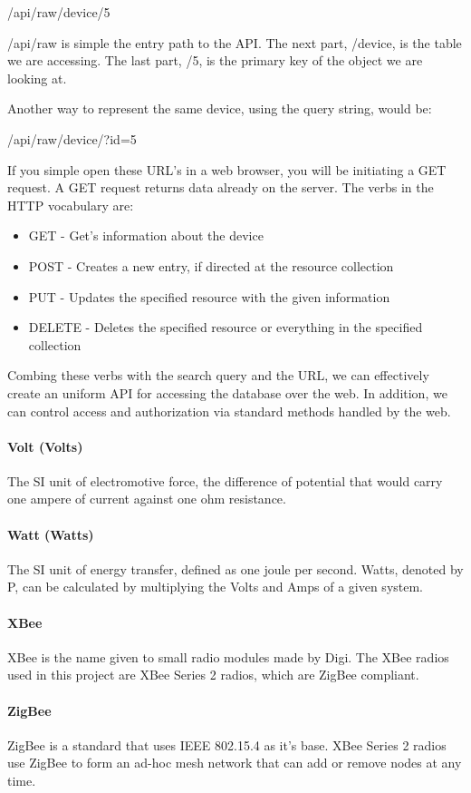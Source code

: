 /api/raw/device/5

/api/raw is simple the entry path to the API. 
The next part, /device, is the table we are accessing. 
The last part, /5, is the primary key of the object we are looking at.

Another way to represent the same device, using the query string, would be:

/api/raw/device/?id=5

If you simple open these URL's in a web browser, you will be initiating a GET request. A GET request returns data already on the server. The verbs in the HTTP vocabulary are:

\begin{itemize}
 \item GET - Get's information about the device
 \item POST - Creates a new entry, if directed at the resource collection
 \item PUT - Updates the specified resource with the given information
 \item DELETE - Deletes the specified resource or everything in the specified collection
\end{itemize}

Combing these verbs with the search query and the URL, we can effectively create an uniform API for accessing the database over the web.
In addition, we can control access and authorization via standard methods handled by the web.

\paragraph{Volt (Volts)}
The SI unit of electromotive force, the difference of potential that would carry one ampere of current against one ohm resistance.

\paragraph{Watt (Watts)}
The SI unit of energy transfer, defined as one joule per second. Watts, denoted by P, can be calculated by multiplying the Volts and Amps of a given system.

\paragraph{XBee}
XBee is the name given to small radio modules made by Digi. The XBee radios used in this project are XBee Series 2 radios, which are ZigBee compliant.

\paragraph{ZigBee}
ZigBee is a standard that uses IEEE 802.15.4 as it's base. XBee Series 2 radios use ZigBee to form an ad-hoc mesh network that can add or remove nodes at any time.